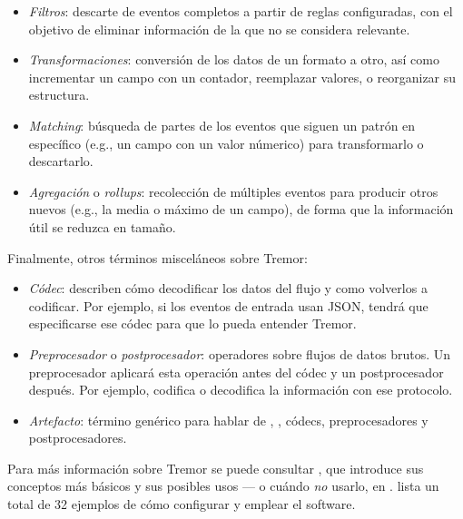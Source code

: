 \begin{itemize}
    \item \emph{Filtros}: descarte de eventos completos a partir de reglas
        configuradas, con el objetivo de eliminar información de la \pipeline
        que no se considera relevante.

    \item \emph{Transformaciones}: conversión de los datos de un formato a otro,
        así como incrementar un campo con un contador, reemplazar valores, o
        reorganizar su estructura.

    \item \emph{Matching}: búsqueda de partes de los eventos que siguen un
        patrón en específico (e.g., un campo  con un valor númerico)
        para transformarlo o descartarlo.

    \item \emph{Agregación} o \emph{rollups}: recolección de múltiples eventos
        para producir otros nuevos (e.g., la media o máximo de un campo), de
        forma que la información útil se reduzca en tamaño.

\end{itemize}

Finalmente, otros términos misceláneos sobre Tremor:

\begin{itemize}
    \item \emph{Códec}: describen cómo decodificar los datos del flujo y como
        volverlos a codificar. Por ejemplo, si los eventos de entrada usan JSON,
        tendrá que especificarse ese códec para que lo pueda entender Tremor.

    \item \emph{Preprocesador} o \emph{postprocesador}: operadores sobre flujos
        de datos brutos. Un preprocesador aplicará esta operación antes del
        códec y un postprocesador después. Por ejemplo,  codifica o
        decodifica la información con ese protocolo.

    \item \emph{Artefacto}: término genérico para hablar de \sinks, \sources,
        códecs, preprocesadores y postprocesadores.

\end{itemize}


Para más información sobre Tremor se puede consultar \textcite{tremorintro}, que
introduce sus conceptos más básicos y sus posibles usos --- o cuándo \emph{no}
usarlo, en \textcite{tremorconstraints}. \textcite{tremorrecipes} lista un total
de 32 ejemplos de cómo configurar y emplear el software.

